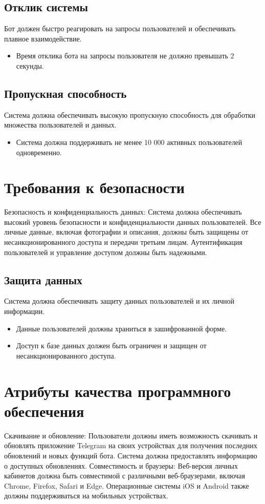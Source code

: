 \documentclass{scrreprt}
\begin{document}
\subsection{Отклик системы}
Бот должен быстро реагировать на запросы пользователей и обеспечивать плавное взаимодействие.
\begin{itemize}
    \item Время отклика бота на запросы пользователя не должно превышать 2 секунды.
\end{itemize}

\subsection{Пропускная способность}
Система должна обеспечивать высокую пропускную способность для обработки множества пользователей и данных.
\begin{itemize}
    \item Система должна поддерживать не менее 10 000 активных пользователей одновременно.
\end{itemize}

\section{Требования к безопасности}
Безопасность и конфиденциальность данных: Система должна обеспечивать высокий уровень безопасности и конфиденциальности данных пользователей. Все личные данные, включая фотографии и описания, должны быть защищены от несанкционированного доступа и передачи третьим лицам. Аутентификация пользователей и управление доступом должны быть надежными.

\subsection{Защита данных}
Система должна обеспечивать защиту данных пользователей и их личной информации.
\begin{itemize}
    \item Данные пользователей должны храниться в зашифрованной форме.
    \item Доступ к базе данных должен быть ограничен и защищен от несанкционированного доступа.
\end{itemize}

\section{Атрибуты качества программного обеспечения}
Скачивание и обновление: Пользователи должны иметь возможность скачивать и обновлять приложение Telegram на своих устройствах для получения последних обновлений и новых функций бота. Система должна предоставлять информацию о доступных обновлениях.
\newline
Совместимость и браузеры: Веб-версия личных кабинетов должна быть совместимой с различными веб-браузерами, включая Chrome, Firefox, Safari и Edge. Операционные системы iOS и Android также должны поддерживаться на мобильных устройствах.
\end{document}
